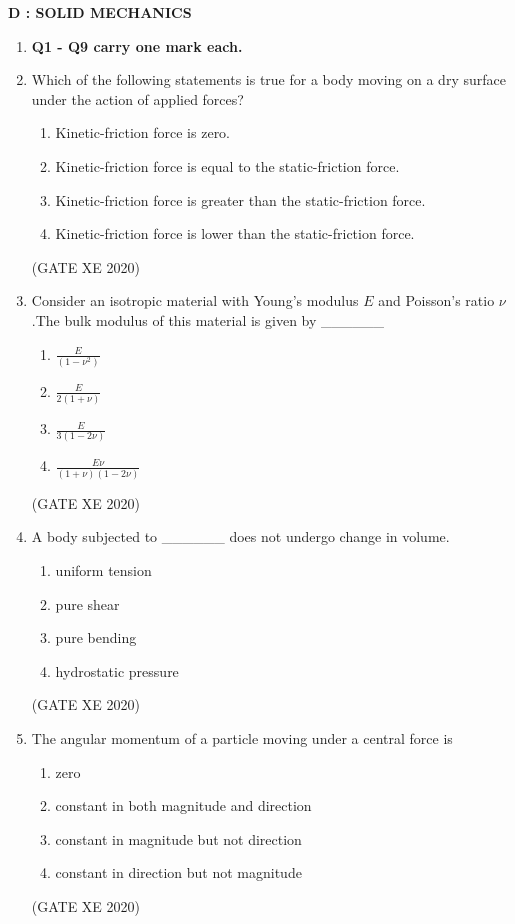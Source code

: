 \documentclass[12pt]{article}
\begin{document}
\newpage
\begin{center}
    {\Large \textbf{D : SOLID MECHANICS} }
\end{center}

\begin{enumerate}

\item[] \textbf{Q1 - Q9 carry one mark each.}

\item Which of the following statements is true for a body moving on a dry surface under the action of applied forces?

\begin{enumerate}
\item Kinetic-friction force is zero.
\item Kinetic-friction force is equal to the static-friction force.
\item Kinetic-friction force is greater than the static-friction force.
\item Kinetic-friction force is lower than the static-friction force.
\end{enumerate}
(GATE XE 2020)

\item Consider an isotropic material with Young's modulus $E$ and Poisson's ratio $\nu$.The bulk modulus of this material is given by \_\_\_\_\_\_
\begin{enumerate}
\item $\frac{E}{(1-\nu^2)}$
\item $\frac{E}{2(1+\nu)}$
\item $\frac{E}{3(1-2\nu)}$
\item $\frac{E\nu}{(1+\nu)(1-2\nu)}$
\end{enumerate}
(GATE XE 2020)

\item A body subjected to \_\_\_\_\_\_ does not undergo change in volume.
\begin{enumerate}
\item uniform tension
\item pure shear
\item pure bending
\item hydrostatic pressure
\end{enumerate}
(GATE XE 2020)

\item The angular momentum of a particle moving under a central force is
\begin{enumerate}
\item zero
\item constant in both magnitude and direction
\item constant in magnitude but not direction
\item constant in direction but not magnitude
\end{enumerate}
(GATE XE 2020)


\end{enumerate}
\end{document}
